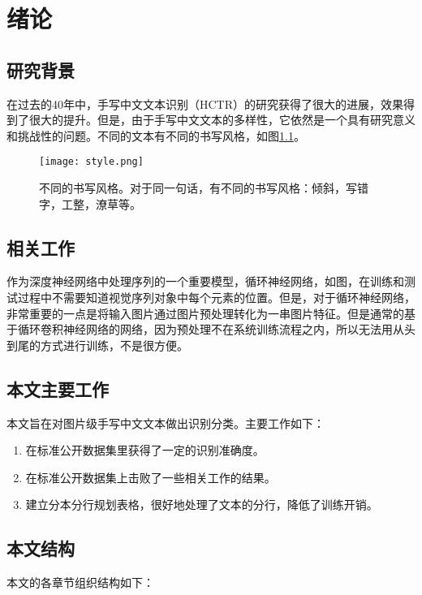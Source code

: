 \documentclass[winfonts, thesis]{njuthesis}
\begin{document}
\chapter{绪论}\label{chapter_introduction}
\section{研究背景}
在过去的40年中，手写中文文本识别（HCTR）的研究获得了很大的进展，效果得到了很大的提升\cite{fujisawa2008forty}。但是，由于手写中文文本的多样性，它依然是一个具有研究意义和挑战性的问题\cite{xu2012touching}。不同的文本有不同的书写风格，如图\ref{fig:style}。

\begin{figure}[htbp]
  \centering
  \texttt{[image: style.png]} %
  \caption{不同的书写风格。对于同一句话，有不同的书写风格：倾斜，写错字，工整，潦草等。}
  \label{fig:style}
\end{figure}

\section{相关工作}

作为深度神经网络中处理序列的一个重要模型，循环神经网络，如图，在训练和测试过程中不需要知道视觉序列对象中每个元素的位置。但是，对于循环神经网络，非常重要的一点是将输入图片通过图片预处理转化为一串图片特征\cite{graves2009novel,su2014accurate}。但是通常的基于循环卷积神经网络的网络，因为预处理不在系统训练流程之内，所以无法用从头到尾的方式进行训练，不是很方便。


\section{本文主要工作}
本文旨在对图片级手写中文文本做出识别分类。主要工作如下：
\begin{enumerate}
  \item 在标准公开数据集里获得了一定的识别准确度。

  \item 在标准公开数据集上击败了一些相关工作的结果。

  \item 建立分本分行规划表格，很好地处理了文本的分行，降低了训练开销。

\end{enumerate}
\section{本文结构}
本文的各章节组织结构如下：
\end{document}
